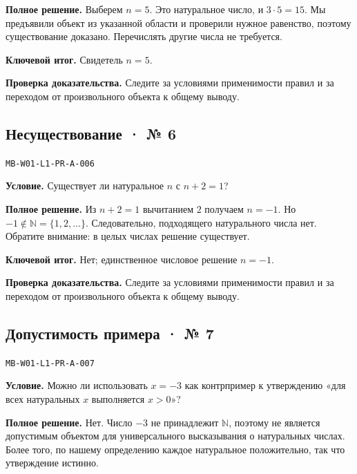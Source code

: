 \documentclass[11pt,a4paper,openany]{book}
\newcommand{\muid}[1]{\texttt{\footnotesize #1}}
\begin{document}
\textbf{Полное решение.} Выберем $n=5$. Это натуральное число, и $3\cdot5=15$. Мы предъявили объект из указанной области и проверили нужное равенство, поэтому существование доказано. Перечислять другие числа не требуется.


\begin{learnbox}\textbf{Ключевой итог.} Свидетель $n=5$.\par \textbf{Проверка доказательства.} 
Следите за условиями применимости правил и за переходом от произвольного объекта к общему выводу. 
\end{learnbox}

\subsection*{Несуществование · № 6}\hypertarget{solution:MB-W01-L1-PR-A-006}{}

\muid{MB-W01-L1-PR-A-006}\par

\textbf{Условие.} Существует ли натуральное $n$ с $n+2=1$?\par

\textbf{Полное решение.} Из $n+2=1$ вычитанием $2$ получаем $n=-1$. Но $-1\notin\mathbb N=\{1,2,\ldots\}$. Следовательно, подходящего натурального числа нет. Обратите внимание: в целых числах решение существует.


\begin{learnbox}\textbf{Ключевой итог.} Нет; единственное числовое решение $n=-1$.\par \textbf{Проверка доказательства.} 
Следите за условиями применимости правил и за переходом от произвольного объекта к общему выводу. 
\end{learnbox}

\subsection*{Допустимость примера · № 7}\hypertarget{solution:MB-W01-L1-PR-A-007}{}

\muid{MB-W01-L1-PR-A-007}\par

\textbf{Условие.} Можно ли использовать $x=-3$ как контрпример к утверждению «для всех натуральных $x$ выполняется $x>0$»?\par

\textbf{Полное решение.} Нет. Число $-3$ не принадлежит $\mathbb N$, поэтому не является допустимым объектом для универсального высказывания о натуральных числах. Более того, по нашему определению каждое натуральное положительно, так что утверждение истинно.
\end{document}
